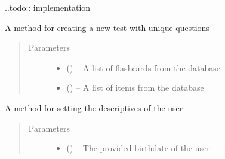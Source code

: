 \documentclass[letterpaper,10pt,english]{sphinxmanual}
\begin{document}
\begin{fulllineitems}
\begin{fulllineitems}
\begin{quote}
\begin{description}
\end{description}\end{quote}

..todo:: implementation

\end{fulllineitems}


\begin{fulllineitems}
\label{\detokenize{user:user.User.create_test}}
A method for creating a new test with unique questions
\begin{quote}\begin{description}
\item[{Parameters}] \leavevmode\begin{itemize}
\item {} 
 (\href{https://docs.python.org/2/library/functions.html\#list}{}\sphinxstyleliteralemphasis{)}\sphinxstyleliteralemphasis{}) -- A list of flashcards from the database

\item {} 
 (\href{https://docs.python.org/2/library/functions.html\#list}{}\sphinxstyleliteralemphasis{)}\sphinxstyleliteralemphasis{}) -- A list of items from the database

\end{itemize}

\end{description}\end{quote}

\end{fulllineitems}


\begin{fulllineitems}
\label{\detokenize{user:user.User.set_descriptives}}
A method for setting the descriptives of the user
\begin{quote}\begin{description}
\item[{Parameters}] \leavevmode\begin{itemize}
\item {} 
 () -- The provided birthdate of the user


\end{itemize}
\end{description}
\end{quote}
\end{fulllineitems}
\end{fulllineitems}
\end{document}
